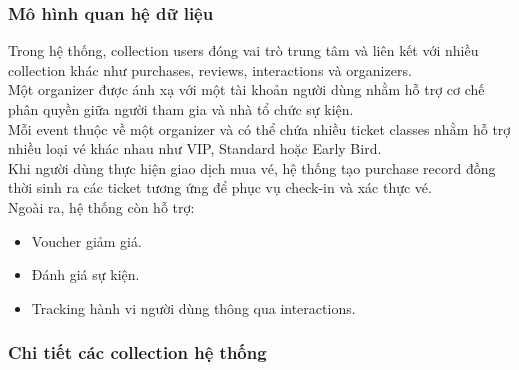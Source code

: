 \subsubsection{Mô hình quan hệ dữ liệu}
Trong hệ thống, collection users đóng vai trò trung tâm và liên kết với nhiều collection khác như purchases, reviews, interactions và organizers.\\
Một organizer được ánh xạ với một tài khoản người dùng nhằm hỗ trợ cơ chế phân quyền giữa người tham gia và nhà tổ chức sự kiện.\\
Mỗi event thuộc về một organizer và có thể chứa nhiều ticket classes nhằm hỗ trợ nhiều loại vé khác nhau như VIP, Standard hoặc Early Bird.\\
Khi người dùng thực hiện giao dịch mua vé, hệ thống tạo purchase record đồng thời sinh ra các ticket tương ứng để phục vụ check-in và xác thực vé.\\
Ngoài ra, hệ thống còn hỗ trợ:
\begin{itemize}
    \item[-] Voucher giảm giá.
    \item[-] Đánh giá sự kiện.
    \item[-] Tracking hành vi người dùng thông qua interactions.
\end{itemize}

\subsubsection{Chi tiết các collection hệ thống}

